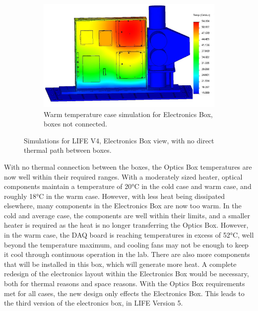 \begin{figure}
    \begin{subfigure}[h]{0.55\textwidth}
        \centering
        \includegraphics[width=\textwidth]{chap3_images/LIFE_V4_images/TA_Full_Model_Iter_12_ebox_FIXED.png}
        \caption{Warm temperature case simulation for Electronics Box, boxes not connected.}
        \label{fig:LIFE_V4_TA_Ebox_2c}
    \end{subfigure}
    \caption{Simulations for LIFE V4, Electronics Box view, with no direct thermal path between boxes.}
    \label{LIFE_V4_TA_2_Ebox}
\end{figure}

With no thermal connection between the boxes, the Optics Box temperatures are now well within their required ranges. With a moderately sized heater, optical components maintain a temperature of 20°C in the cold case and warm case, and roughly 18°C in the warm case. However, with less heat being dissipated elsewhere, many components in the Electronics Box are now too warm. In the cold and average case, the components are well within their limits, and a smaller heater is required as the heat is no longer transferring the Optics Box. However, in the warm case, the DAQ board is reaching temperatures in excess of 52°C, well beyond the temperature maximum, and cooling fans may not be enough to keep it cool through continuous operation in the lab. There are also more components that will be installed in this box, which will generate more heat. A complete redesign of the electronics layout within the Electronics Box would be necessary, both for thermal reasons and space reasons. With the Optics Box requirements met for all cases, the new design only effects the Electronics Box. This leads to the third version of the electronics box, in LIFE Version 5.

